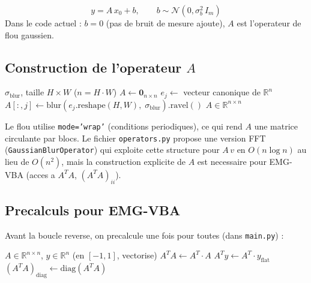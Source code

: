\documentclass[12pt]{article}
\newcommand{\R}{\mathbb{R}}
\newcommand{\N}{\mathcal{N}}
\newcommand{\diag}{\mathrm{diag}}
\newcommand{\file}[1]{\texttt{\color{codeblue}#1}}
\newcommand{\func}[1]{\texttt{\color{codered}#1}}
\newcommand{\rapport}[1]{\textcolor{codeblue}{\textbf{[Rapport~eq.~#1]}}}
\begin{document}
\begin{resultbox}[Probleme inverse lineaire \rapport{H2}]
\begin{equation}
  y = A\,x_0 + b, \qquad b \sim \N(0, \sigma_b^2\, I_m) \label{eq:obs}
\end{equation}
Dans le code actuel : $b = 0$ (pas de bruit de mesure ajoute), $A$ est l'operateur de flou gaussien.
\end{resultbox}

\subsection{Construction de l'operateur $A$}

\begin{algorithm}[H]
\caption{Construction de la matrice $A$ --- \file{degrade.py} $\to$ \func{build\_A}}
\begin{algorithmic}[1]
\Require $\sigma_{\text{blur}}$, taille $H \times W$ ($n = H \cdot W$)
\State $A \gets \mathbf{0}_{n \times n}$ 
  \State $e_j \gets$ vecteur canonique de $\R^n$
  \State $A[:,j] \gets \text{blur}(e_j.\text{reshape}(H,W),\; \sigma_{\text{blur}}).\text{ravel}()$
\EndFor
\Ensure $A \in \R^{n \times n}$
\end{algorithmic}
\end{algorithm}

\begin{remarkbox}
Le flou utilise \texttt{mode='wrap'} (conditions periodiques), ce qui rend $A$ une matrice circulante par blocs. Le fichier \file{operators.py} propose une version FFT (\func{GaussianBlurOperator}) qui exploite cette structure pour $A\,v$ en $O(n \log n)$ au lieu de $O(n^2)$, mais la construction explicite de $A$ est necessaire pour EMG-VBA (acces a $A^T A$, $(A^T A)_{ii}$).
\end{remarkbox}

\subsection{Precalculs pour EMG-VBA}
\label{sec:precalculs}

Avant la boucle reverse, on precalcule une fois pour toutes (dans \file{main.py}) :
\begin{algorithm}[H]
\caption{Precalculs --- \file{main.py}}
\begin{algorithmic}[1]
\Require $A \in \R^{n \times n}$, $y \in \R^n$ (en $[-1,1]$, vectorise)
\State $A^T A \gets A^T \cdot A$ 
\State $A^T y \gets A^T \cdot y_{\text{flat}}$
\State $(A^T A)_{\text{diag}} \gets \diag(A^T A)$ 
\end{algorithmic}
\end{algorithm}
\end{document}

